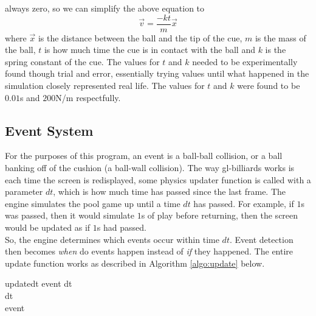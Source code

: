     always zero, so we can simplify the above equation to
    \begin{equation}
        \vec v = \frac{-k t}{m}\vec x
        \label{equ:shot_velocity}
    \end{equation}
    where $\vec x$ is the distance between the ball and the tip of the cue, $m$ is the mass of the ball, $t$ is how much time the
    cue is in contact with the ball and $k$ is the spring constant of the cue. The values for $t$ and $k$ needed to be experimentally
    found though trial and error, essentially trying values until what happened in the simulation closely represented real life. The
    values for $t$ and $k$ were found to be $0.01$s and $200$N/m respectfully.
    
    \subsection{Event System}
    For the purposes of this program, an event is a ball-ball collision, or a ball banking off of the cushion (a ball-wall collision). The
    way gl-billiards works is each time the screen is redisplayed, some physics updater function is called with a parameter $dt$, which
    is how much time has passed since the last frame. The engine simulates the pool game up until a time $dt$ has passed. For example,
    if $1$s was passed, then it would  simulate $1$s of play before returning, then the screen would be updated as if $1$s had passed.  \\
    So, the engine determines which events occur within time $dt$. Event detection then becomes \textit{when} do events happen instead
    of \textit{if} they happened. The entire update function works as described in Algorithm \ref{algo:update} below.   \\
    \begin{center}
    \begin{pseudocode}[framebox]{update}{dt}
        event \gets {} dt     \\
        \IF {}
        \THEN {} dt                                 \\
        \ELSE \BEGIN
             event               \\
                              \\
        \END
        \label{algo:update}
    \end{pseudocode}
    \end{center}

